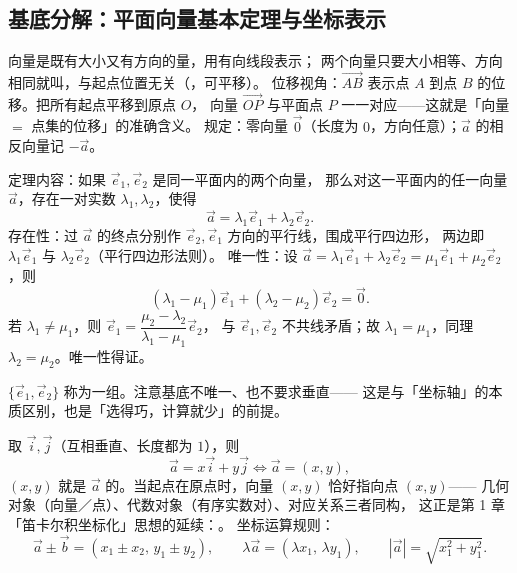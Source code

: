 \begin{explore}

\subsection{基底分解：平面向量基本定理与坐标表示}


向量是既有大小又有方向的量，用有向线段表示；
两个向量只要大小相等、方向相同就叫，与起点位置无关（，可平移）。
位移视角：$\overrightarrow{AB}$ 表示点 $A$ 到点 $B$ 的位移。把所有起点平移到原点 $O$，
向量 $\overrightarrow{OP}$ 与平面点 $P$ 一一对应——这就是「向量 $=$ 点集的位移」的准确含义。
规定：零向量 $\vec 0$（长度为 $0$，方向任意）；$\vec a$ 的相反向量记 $-\vec a$。

\begin{derivation}
定理内容：如果 $\vec e_1,\vec e_2$ 是同一平面内的两个向量，
那么对这一平面内的任一向量 $\vec a$，存在一对实数 $\lambda_1,\lambda_2$，使得
\[
  \vec a=\lambda_1\vec e_1+\lambda_2\vec e_2.
\]
存在性：过 $\vec a$ 的终点分别作 $\vec e_2,\vec e_1$ 方向的平行线，围成平行四边形，
两边即 $\lambda_1\vec e_1$ 与 $\lambda_2\vec e_2$（平行四边形法则）。
唯一性：设 $\vec a=\lambda_1\vec e_1+\lambda_2\vec e_2=\mu_1\vec e_1+\mu_2\vec e_2$，则
\[
  (\lambda_1-\mu_1)\vec e_1+(\lambda_2-\mu_2)\vec e_2=\vec 0.
\]
若 $\lambda_1\neq\mu_1$，则 $\vec e_1=\dfrac{\mu_2-\lambda_2}{\lambda_1-\mu_1}\vec e_2$，
与 $\vec e_1,\vec e_2$ 不共线矛盾；故 $\lambda_1=\mu_1$，同理 $\lambda_2=\mu_2$。唯一性得证。
\end{derivation}
$\{\vec e_1,\vec e_2\}$ 称为一组。注意基底不唯一、也不要求垂直——
这是与「坐标轴」的本质区别，也是「选得巧，计算就少」的前提。

取 $\vec i,\vec j$（互相垂直、长度都为 $1$），则
\[
  \vec a=x\vec i+y\vec j \iff \vec a=(x,y),
\]
$(x,y)$ 就是 $\vec a$ 的。当起点在原点时，向量 $(x,y)$ 恰好指向点 $(x,y)$——
几何对象（向量／点）、代数对象（有序实数对）、对应关系三者同构，
这正是第 1 章「笛卡尔积坐标化」思想的延续：。
坐标运算规则：
\[
  \vec a\pm\vec b=(x_1\pm x_2,\,y_1\pm y_2),\qquad
  \lambda\vec a=(\lambda x_1,\,\lambda y_1),\qquad
  |\vec a|=\sqrt{x_1^2+y_1^2}.
\]


\end{explore}
